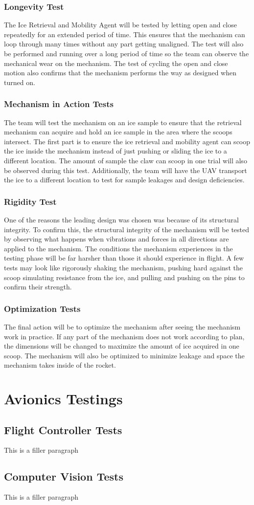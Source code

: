 		\subsubsection{Longevity Test}
		The Ice Retrieval and Mobility Agent will be tested by letting open and close repeatedly for an extended period of time. This ensures that the mechanism can loop through many times without any part getting unaligned. The test will also be performed and running over a long period of time so the team can observe the mechanical wear on the mechanism. The test of cycling the open and close motion also confirms that the mechanism performs the way as designed when turned on. 
		\subsubsection{Mechanism in Action Tests}
		The team will test the mechanism on an ice sample to ensure that the retrieval mechanism can acquire and hold an ice sample in the area where the scoops intersect. The first part is to ensure the ice retrieval and mobility agent can scoop the ice inside the mechanism instead of just pushing or sliding the ice to a different location. The amount of sample the claw can scoop in one trial will also be observed during this test. Additionally, the team will have the UAV transport the ice to a different location to test for sample leakages and design deficiencies.
		\subsubsection{Rigidity Test}
		One of the reasons the leading design was chosen was because of its structural integrity. To confirm this, the structural integrity of the mechanism will be tested by observing what happens when vibrations and forces in all directions are applied to the mechanism. The conditions the mechanism experiences in the testing phase will be far harsher than those it should experience in flight. A few tests may look like rigorously shaking the mechanism, pushing hard against the scoop simulating resistance from the ice, and pulling and pushing on the pins to confirm their strength. 
		\subsubsection{Optimization Tests}
		The final action will be to optimize the mechanism after seeing the mechanism work in practice. If any part of the mechanism does not work according to plan, the dimensions will be changed to maximize the amount of ice acquired in one scoop. The mechanism will also be optimized to minimize leakage and space the mechanism takes inside of the rocket.   

\section{Avionics Testings}\label{PL:Testing:Avionics}
	\subsection{Flight Controller Tests}
		This is a filler paragraph

	\subsection{Computer Vision Tests}
		This is a filler paragraph





